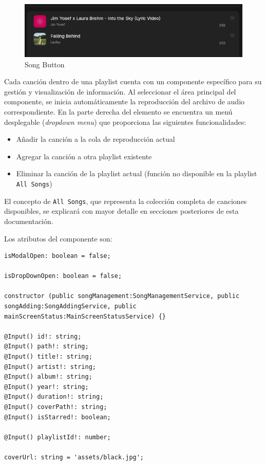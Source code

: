 \documentclass[11pt, a4paper]{article}
\begin{document}
                \begin{figure}[H]
                    \centering
                    \includegraphics[width=1\textwidth]{media/screenshots/songbutton.png}
                    \caption{Song Button}
                    \label{fig:songbutton}
                \end{figure}

                Cada canción dentro de una playlist cuenta con un componente específico para su gestión y visualización de información. Al seleccionar el área principal del componente, se inicia automáticamente la reproducción del archivo de audio correspondiente. En la parte derecha del elemento se encuentra un menú desplegable (\textit{dropdown menu}) que proporciona las siguientes funcionalidades:

                \begin{itemize}
                    \item Añadir la canción a la cola de reproducción actual
                    \item Agregar la canción a otra playlist existente
                    \item Eliminar la canción de la playlist actual (función no disponible en la playlist \texttt{All Songs})
                \end{itemize}

                El concepto de \texttt{All Songs}, que representa la colección completa de canciones disponibles, se explicará con mayor detalle en secciones posteriores de esta documentación.

                Los atributos del componente son:

                \begin{lstlisting}[caption={Atributos Song Button}]
isModalOpen: boolean = false;

isDropDownOpen: boolean = false;

constructor (public songManagement:SongManagementService, public songAdding:SongAddingService, public mainScreenStatus:MainScreenStatusService) {}

@Input() id!: string;
@Input() path!: string;
@Input() title!: string;
@Input() artist!: string;
@Input() album!: string;
@Input() year!: string;
@Input() duration!: string;
@Input() coverPath!: string;
@Input() isStarred!: boolean;

@Input() playlistId!: number;

coverUrl: string = 'assets/black.jpg';
                \end{lstlisting}
\end{document}
